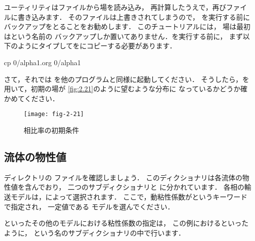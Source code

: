 %
%
ユーティリティはファイルから場を読み込み，
再計算したうえで，再びファイルに書き込みます．
そのファイルは上書きされてしまうので，
を実行する前にバックアップをとることをお勧めします．
このチュートリアルには，
場は最初はという名前の
バックアップしか置いてありません．を実行する前に，
まず以下のようにタイプしてをにコピーする必要があります．
\begin{OFverbatim}[terminal]
cp 0/alpha1.org 0/alpha1
\end{OFverbatim}

さて，それでは
%
%
を他のプログラムと同様に起動してください．
そうしたら，を用いて，初期の場が
\autoref{fig:2.21}のように望むような分布に
なっているかどうか確かめてください．


\begin{figure}[ht]
 \texttt{[image: fig-2-21]}
 \caption{相比率の初期条件}
 \label{fig:2.21}
\end{figure}


\subsection{流体の物性値}
\label{ssec:2.3.4}
ディレクトリの
%
%
ファイルを確認しましょう．
このディクショナリは各流体の物性値を含んでおり，
二つのサブディクショナリと
に分かれています．
各相の輸送モデルは，によって選択されます．
ここで，動粘性係数がというキーワードで指定され，
一定値である
%
%
モデルを選んでください．

%
%
といったその他のモデルにおける粘性係数の指定は，
この例におけるといったように，
という名のサブディクショナリの中で行います．

